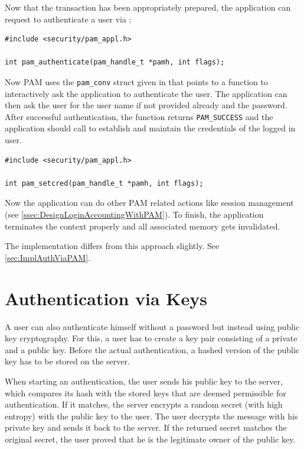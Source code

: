 \documentclass[10pt,a4paper,titlepage,twoside,english,final]{zhawreprt}
\begin{document}
Now that the transaction has been appropriately prepared, the application can request to authenticate a user via \cite{pam_authenticate}:
\setlistingC
\begin{lstlisting}[caption={\gls{PAM} authentication},label=lst:PAMAuthentication]
#include <security/pam_appl.h>

int pam_authenticate(pam_handle_t *pamh, int flags);
\end{lstlisting}

Now \gls{PAM} uses the \texttt{pam\_conv} struct given in \cite{pam_start} that points to a function to interactively ask the application to authenticate the user.
The application can then ask the user for the user name if not provided already and the password.
After successful authentication, the function returns \texttt{PAM\_SUCCESS} and the application should call \cite{pam_setcred} to establish and maintain the credentials of the logged in user.
\setlistingC
\begin{lstlisting}[caption={\gls{PAM} credential setting},label=lst:PAMCredSet]
#include <security/pam_appl.h>

int pam_setcred(pam_handle_t *pamh, int flags);
\end{lstlisting}

Now the application can do other \gls{PAM} related actions like session management (see \ref{ssec:DesignLoginAccountingWithPAM}).
To finish, the application terminates the context properly and all associated memory gets invalidated.

The implementation differs from this approach slightly.
See \ref{sec:ImplAuthViaPAM}.

\section{Authentication via Keys}\label{sec:DesignAuthViaKeys}
A user can also authenticate himself without a password but instead using public key cryptography.
For this, a user has to create a key pair consisting of a private and a public key.
Before the actual authentication, a hashed version of the public key has to be stored on the server.

When starting an authentication, the user sends his public key to the server, which compares its hash with the stored keys that are deemed permissible for authentication.
If it matches, the server encrypts a random secret (with high entropy) with the public key to the user.
The user decrypts the message with his private key and sends it back to the server.
If the returned secret matches the original secret, the user proved that he is the legitimate owner of the public key.
\end{document}
